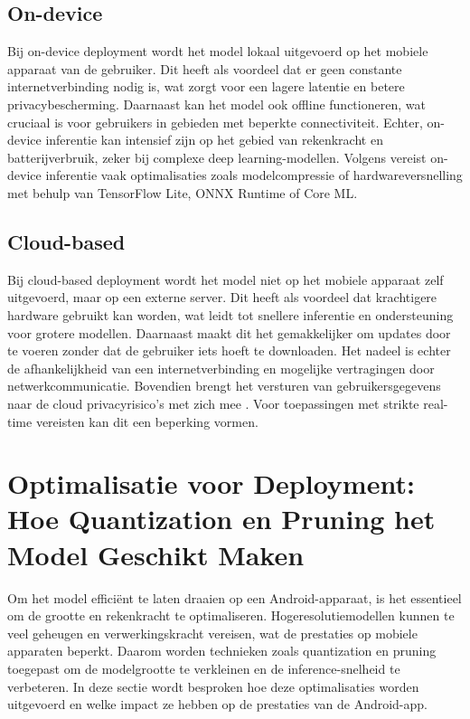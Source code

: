 \subsection{On-device}
\label{subsec:on-device}
Bij on-device deployment wordt het model lokaal uitgevoerd op het mobiele apparaat van de gebruiker. 
Dit heeft als voordeel dat er geen constante internetverbinding nodig is, wat zorgt voor een lagere latentie en betere privacybescherming. 
Daarnaast kan het model ook offline functioneren, wat cruciaal is voor gebruikers in gebieden met beperkte connectiviteit. 
Echter, on-device inferentie kan intensief zijn op het gebied van rekenkracht en batterijverbruik, zeker bij complexe deep learning-modellen. 
Volgens \textcite{8360327} vereist on-device inferentie vaak optimalisaties zoals modelcompressie of hardwareversnelling met behulp van TensorFlow Lite, ONNX Runtime of Core ML.

\subsection{Cloud-based}
\label{subsec:cloud-based}
Bij cloud-based deployment wordt het model niet op het mobiele apparaat zelf uitgevoerd, maar op een externe server. 
Dit heeft als voordeel dat krachtigere hardware gebruikt kan worden, wat leidt tot snellere inferentie en ondersteuning voor grotere modellen. 
Daarnaast maakt dit het gemakkelijker om updates door te voeren zonder dat de gebruiker iets hoeft te downloaden. 
Het nadeel is echter de afhankelijkheid van een internetverbinding en mogelijke vertragingen door netwerkcommunicatie. 
Bovendien brengt het versturen van gebruikersgegevens naar de cloud privacyrisico’s met zich mee \autocite{8360327}.
Voor toepassingen met strikte real-time vereisten kan dit een beperking vormen.

\section{Optimalisatie voor Deployment: Hoe Quantization en Pruning het Model Geschikt Maken}
Om het model efficiënt te laten draaien op een Android-apparaat, is het essentieel om de grootte en rekenkracht te optimaliseren. 
Hogeresolutiemodellen kunnen te veel geheugen en verwerkingskracht vereisen, wat de prestaties op mobiele apparaten beperkt. 
Daarom worden technieken zoals quantization en pruning toegepast om de modelgrootte te verkleinen en de inference-snelheid te verbeteren. 
In deze sectie wordt besproken hoe deze optimalisaties worden uitgevoerd en welke impact ze hebben op de prestaties van de Android-app.
\\
\\

